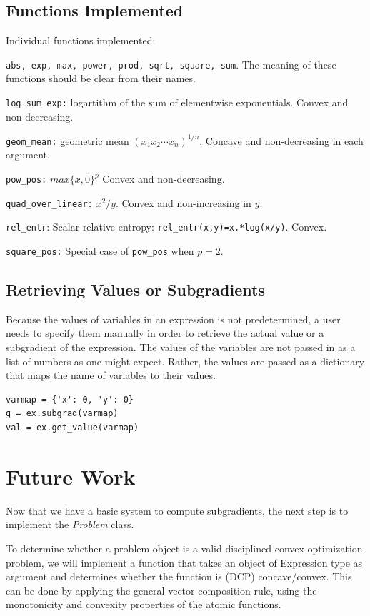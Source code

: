 \documentclass[12pt]{article}
\begin{document}
\subsection{Functions Implemented}
Individual functions implemented:
\BIT

\item \verb'abs, exp, max, power, prod, sqrt, square, sum'. The meaning of these functions should be clear from their names.
\item \verb'log_sum_exp:' logartithm of the sum of elementwise
  exponentials. Convex and non-decreasing. 
\item \verb'geom_mean:' geometric mean $(x_1x_2 \cdots x_n)^{1/n}$. Concave and
  non-decreasing in each argument. 
\item \verb'pow_pos:' $max\{x,0\}^p $ Convex and non-decreasing. 
\item \verb'quad_over_linear:' $x^2/y$. Convex and non-increasing in $y$.
\item \verb'rel_entr': Scalar relative entropy: \verb'rel_entr(x,y)=x.*log(x/y)'. Convex.
\item \verb'square_pos:' Special case of \verb'pow_pos' when $p=2$.
\EIT


\subsection{Retrieving Values or Subgradients}
Because the values of variables in an expression is not predetermined, a user needs to specify them manually in order to retrieve the actual value or a subgradient of the expression. The values of the variables are not passed in as a list of numbers as one might expect. Rather, the values are passed as a dictionary that maps the name of variables to their values.
\begin{verbatim}
varmap = {'x': 0, 'y': 0}
g = ex.subgrad(varmap)
val = ex.get_value(varmap)
\end{verbatim}


\section{Future Work}

Now that we have a basic system to compute subgradients, the next step is to implement the \textit{Problem} class.

\BIT

\item To determine whether a problem object is a valid disciplined convex optimization problem, 
we will implement a function that takes an object of Expression type as argument and determines whether the function is (DCP) concave/convex. This can be done by applying the general vector composition rule\cite{cvx}, using the monotonicity and convexity properties of the atomic functions. 
\end{document}
